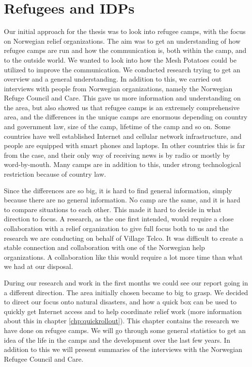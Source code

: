 \chapter{Refugees and IDPs}
\label{chp:refugeecamps} 
Our initial approach for the thesis was to look into refugee camps, with the focus on Norwegian relief organizations. The aim was to get an understanding of how refugee camps are run and how the communication is, both within the camp, and to the outside world. We wanted to look into how the Mesh Potatoes could be utilized to improve the communication. We conducted research trying to get an overview and a general understanding. In addition to this, we carried out interviews with people from Norwegian organizations, namely the Norwegian Refuge Council and Care. This gave us more information and understanding on the area, but also showed us that refugee camps is an extremely comprehensive area, and the differences in the unique camps are enormous depending on country and government law, size of the camp, lifetime of the camp and so on. Some countries have well established Internet and cellular network infrastructure, and people are equipped with smart phones and laptops. In other countries this is far from the case, and their only way of receiving news is by radio or mostly by word-by-mouth. Many camps are in addition to this, under strong technological restriction because of country law. 

Since the differences are so big, it is hard to find general information, simply because there are no general information. No camp are the same, and it is hard to compare situations to each other. This made it hard to decide in what direction to focus. A research, as the one first intended, would require a close collaboration with a relief organization to give full focus both to us and the research we are conducting on behalf of Village Telco. It was difficult to create a stable connection and collaboration with one of the Norwegian help organizations. A collaboration like this would require a lot more time than what we had at our disposal. 
  
During our research and work in the first months we could see our report going in a different direction. The area initially chosen became to big to grasp. We decided to direct our focus onto natural disasters, and how a \gls{quick} box can be used to quickly get Internet access and to help coordinate relief work (more information about this in chapter \ref{chp:quickrollout}).
This chapter contains the research we have done on refugee camps. We will go through some general statistics to get an idea of the life in the camps and the development over the last few years. In addition to this we will present summaries of the interviews with the Norwegian Refugee Council and Care.

